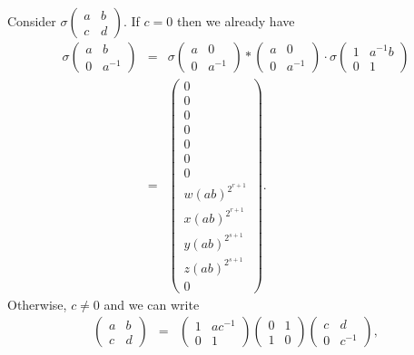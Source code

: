 Consider
$\sigma\left(\begin{matrix} a & b \\ c & d \end{matrix}\right)$.
If $c=0$ then we already have
\begin{eqnarray*}
\sigma\left(\begin{matrix} a & b \\ 0 & a^{-1} \end{matrix}\right) &=&
\sigma\left(\begin{matrix} a & 0 \\ 0 & a^{-1} \end{matrix}\right) * 
\left(\begin{matrix} a & 0 \\ 0 & a^{-1} \end{matrix}\right)\cdot
\sigma\left(\begin{matrix} 1 & a^{-1}b \\ 0 & 1 \end{matrix}\right) \\
&=&
\left( \begin{matrix}
0 \\
0 \\
0 \\
0 \\
0 \\
0 \\
0 \\
w(ab)^{2^{r+1}} \\
x(ab)^{2^{r+1}} \\
y(ab)^{2^{s+1}} \\
z(ab)^{2^{s+1}} \\
0
\end{matrix} \right).
\end{eqnarray*}
Otherwise, $c\neq 0$ and we can write
\begin{eqnarray*}
\left(\begin{matrix} a & b \\ c & d \end{matrix}\right) &=& 
\left(\begin{matrix} 1 & ac^{-1} \\ 0 & 1 \end{matrix}\right)
\left(\begin{matrix} 0 & 1 \\ 1 & 0 \end{matrix}\right)
\left(\begin{matrix} c & d \\ 0 & c^{-1} \end{matrix}\right),
\end{eqnarray*}
